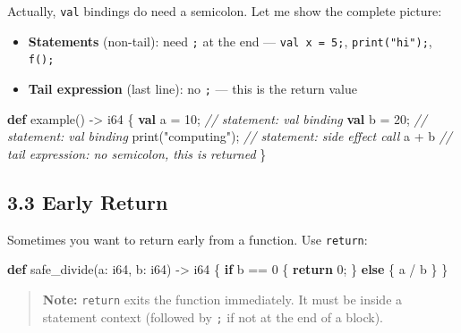 \documentclass[
  english,
]{book}
\newenvironment{Shaded}{\begin{snugshade}}{\end{snugshade}}
\newcommand{\CommentTok}[1]{\textcolor[rgb]{0.42,0.60,0.33}{\textit{#1}}}
\newcommand{\ControlFlowTok}[1]{\textcolor[rgb]{0.77,0.53,0.75}{\textbf{#1}}}
\newcommand{\DataTypeTok}[1]{\textcolor[rgb]{0.31,0.79,0.69}{#1}}
\newcommand{\DecValTok}[1]{\textcolor[rgb]{0.71,0.81,0.66}{#1}}
\newcommand{\FunctionTok}[1]{\textcolor[rgb]{0.86,0.86,0.67}{#1}}
\newcommand{\KeywordTok}[1]{\textcolor[rgb]{0.34,0.61,0.84}{\textbf{#1}}}
\newcommand{\NormalTok}[1]{\textcolor[rgb]{0.83,0.83,0.83}{#1}}
\newcommand{\OperatorTok}[1]{\textcolor[rgb]{0.83,0.83,0.83}{#1}}
\newcommand{\StringTok}[1]{\textcolor[rgb]{0.81,0.57,0.47}{#1}}
\providecommand{\tightlist}{%
  \setlength{\itemsep}{0pt}\setlength{\parskip}{0pt}}
\begin{document}
Actually, \texttt{val} bindings do need a semicolon. Let me show the
complete picture:

\begin{itemize}
\tightlist
\item
  \textbf{Statements} (non-tail): need \texttt{;} at the end ---
  \texttt{val\ x\ =\ 5;}, \texttt{print("hi");}, \texttt{f();}
\item
  \textbf{Tail expression} (last line): no \texttt{;} --- this is the
  return value
\end{itemize}

\begin{Shaded}
\begin{Highlighting}[]
\KeywordTok{def}\NormalTok{ example() }\OperatorTok{{-}\textgreater{}} \DataTypeTok{i64}\NormalTok{ \{}
    \KeywordTok{val}\NormalTok{ a }\OperatorTok{=} \DecValTok{10}\NormalTok{;          }\CommentTok{// statement: val binding}
    \KeywordTok{val}\NormalTok{ b }\OperatorTok{=} \DecValTok{20}\NormalTok{;          }\CommentTok{// statement: val binding}
    \FunctionTok{print}\NormalTok{(}\StringTok{"computing"}\NormalTok{);  }\CommentTok{// statement: side effect call}
\NormalTok{    a }\OperatorTok{+}\NormalTok{ b                }\CommentTok{// tail expression: no semicolon, this is returned}
\NormalTok{\}}
\end{Highlighting}
\end{Shaded}

\subsection{3.3 Early Return}\label{early-return}

Sometimes you want to return early from a function. Use \texttt{return}:

\begin{Shaded}
\begin{Highlighting}[]
\KeywordTok{def}\NormalTok{ safe\_divide(a: }\DataTypeTok{i64}\NormalTok{, b: }\DataTypeTok{i64}\NormalTok{) }\OperatorTok{{-}\textgreater{}} \DataTypeTok{i64}\NormalTok{ \{}
    \ControlFlowTok{if}\NormalTok{ b }\OperatorTok{==} \DecValTok{0}\NormalTok{ \{}
        \ControlFlowTok{return} \DecValTok{0}\NormalTok{;}
\NormalTok{    \} }\ControlFlowTok{else}\NormalTok{ \{}
\NormalTok{        a }\OperatorTok{/}\NormalTok{ b}
\NormalTok{    \}}
\NormalTok{\}}
\end{Highlighting}
\end{Shaded}

\begin{quote}
\textbf{Note:} \texttt{return} exits the function immediately. It must
be inside a statement context (followed by \texttt{;} if not at the end
of a block).
\end{quote}
\end{document}
